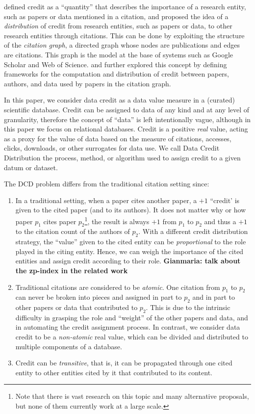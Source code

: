 \cite{katz2020SoftwareandData}  defined credit as a ``quantity'' that describes the importance of a research entity, such as papers or data mentioned in a citation, and proposed the idea of a \emph{distribution} of credit from research entities, such as papers or data, to other research entities through citations. 
This can be done by exploiting the structure of the \emph{citation graph}, a directed graph whose nodes are publications and edges are citations.
This graph is the model at the base of systems such as Google Scholar and Web of Science.
\cite{zeng2020assigning} and \cite{creditFang18} further explored this concept by defining frameworks for the  computation and distribution of credit between papers, authors, and data used by papers in the citation graph. 

In this paper, we consider data credit as a data value measure in a (curated) scientific database. Credit can be assigned to data of any kind and at any level of granularity, therefore the concept of ``data'' is left intentionally vague, although in this paper we focus on relational databases.
Credit is a positive \emph{real} value, acting as a proxy for the value of data based on the measure of citations, accesses, clicks, downloads, or other surrogates for data use. We call Data Credit Distribution the process, method, or algorithm used to assign credit to a given datum or dataset.

The DCD problem differs from the traditional citation setting since:
\begin{enumerate}
    \item In a traditional setting, when a paper cites another paper, a $+1$ ``credit' is given to the cited paper (and to its authors). It does not matter why or how paper $p_1$ cites paper $p_2$\footnote{Note that there is vast research on this topic and many alternative proposals, but none of them currently work at a large scale.}, the result is always $+1$ from $p_1$ to $p_2$ and thus a $+1$ to the citation count of the authors of $p_2$. With a different credit distribution strategy, the ``value'' given to the cited entity can be \emph{proportional} to the role played in the citing entity. Hence, we can weigh the importance of the cited entities and assign credit according to their role.
    \textbf{Gianmaria: talk about the zp-index in the related work}
    \item Traditional citations are considered to be  \emph{atomic}. One citation from $p_1$ to $p_2$ can never be broken into pieces and assigned in part to $p_2$ and in part to other papers or data that contributed to $p_2$. This is due to the intrinsic difficulty in grasping the role and ``weight'' of the other papers and data, and in automating the credit assignment process.
	In contrast, we consider data credit to be a \emph{non-atomic} real value, which can be divided and distributed to multiple components of a database. 
	\item Credit can be \emph{transitive}, that is, it can be propagated through one cited entity to other entities cited by it that contributed to its content.
\end{enumerate}

